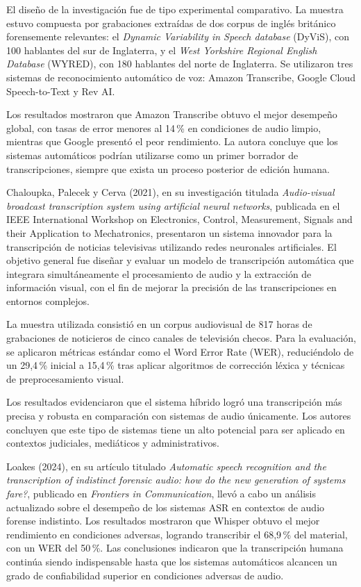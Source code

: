 \documentclass[12pt,a4paper,oneside]{report}
\begin{document}
El diseño de la investigación fue de tipo experimental comparativo. La muestra estuvo compuesta por grabaciones extraídas de dos corpus de inglés británico forensemente relevantes: el \textit{Dynamic Variability in Speech database} (DyViS), con 100 hablantes del sur de Inglaterra, y el \textit{West Yorkshire Regional English Database} (WYRED), con 180 hablantes del norte de Inglaterra. Se utilizaron tres sistemas de reconocimiento automático de voz: Amazon Transcribe, Google Cloud Speech-to-Text y Rev AI.

Los resultados mostraron que Amazon Transcribe obtuvo el mejor desempeño global, con tasas de error menores al 14\,\% en condiciones de audio limpio, mientras que Google presentó el peor rendimiento. La autora concluye que los sistemas automáticos podrían utilizarse como un primer borrador de transcripciones, siempre que exista un proceso posterior de edición humana.

Chaloupka, Palecek y Cerva (2021), en su investigación titulada \textit{Audio-visual broadcast transcription system using artificial neural networks}, publicada en el IEEE International Workshop on Electronics, Control, Measurement, Signals and their Application to Mechatronics, presentaron un sistema innovador para la transcripción de noticias televisivas utilizando redes neuronales artificiales. El objetivo general fue diseñar y evaluar un modelo de transcripción automática que integrara simultáneamente el procesamiento de audio y la extracción de información visual, con el fin de mejorar la precisión de las transcripciones en entornos complejos.

La muestra utilizada consistió en un corpus audiovisual de 817 horas de grabaciones de noticieros de cinco canales de televisión checos. Para la evaluación, se aplicaron métricas estándar como el Word Error Rate (WER), reduciéndolo de un 29,4\,\% inicial a 15,4\,\% tras aplicar algoritmos de corrección léxica y técnicas de preprocesamiento visual.

Los resultados evidenciaron que el sistema híbrido logró una transcripción más precisa y robusta en comparación con sistemas de audio únicamente. Los autores concluyen que este tipo de sistemas tiene un alto potencial para ser aplicado en contextos judiciales, mediáticos y administrativos.

Loakes (2024), en su artículo titulado \textit{Automatic speech recognition and the transcription of indistinct forensic audio: how do the new generation of systems fare?}, publicado en \textit{Frontiers in Communication}, llevó a cabo un análisis actualizado sobre el desempeño de los sistemas ASR en contextos de audio forense indistinto. Los resultados mostraron que Whisper obtuvo el mejor rendimiento en condiciones adversas, logrando transcribir el 68,9\,\% del material, con un WER del 50\,\%. Las conclusiones indicaron que la transcripción humana continúa siendo indispensable hasta que los sistemas automáticos alcancen un grado de confiabilidad superior en condiciones adversas de audio.
\end{document}
